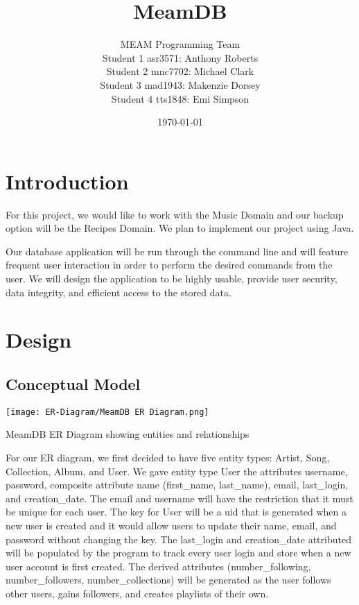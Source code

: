 \documentclass[12pt]{article}
\title{MeamDB}
\date{\today}
\author{MEAM Programming Team \\
Student 1 asr3571: Anthony Roberts\\
Student 2 mnc7702: Michael Clark\\
Student 3 mad1943: Makenzie Dorsey\\
Student 4 tts1848: Emi Simpson\\
}
\begin{document}
    \maketitle

    \section{Introduction}
    For this project, we would like to work with the Music Domain
    and our backup option will be the Recipes Domain. We plan to
    implement our project using Java.

    \vspace{0.5cm}

    \noindent Our database application will be run through the command line
    and will feature frequent user interaction in order to perform the desired
    commands from the user. We will design the application to be highly usable,
    provide user security, data integrity, and efficient access to the stored data.

    \section{Design}
    \subsection{Conceptual Model}

    \vspace{0.5cm}


    \begin{center}
    \texttt{[image: ER-Diagram/MeamDB ER Diagram.png]}
    \caption{MeamDB ER Diagram showing entities and relationships}
    \label{ER Diagram}
    \end{center}

    \vspace{0.5cm}

    \noindent For our ER diagram, we first decided to have five entity types:
    Artist, Song, Collection, Album, and User. We gave entity type User the attributes
    username, password, composite attribute name (first\_name, last\_name), email,
    last\_login, and creation\_date. The email and username will have the restriction that it must be unique
    for each user. The key for User will be a uid that is generated when a new user is
    created and it would allow users to update their name, email, and password without
    changing the key. The last\_login and creation\_date attributed will be populated by the program
    to track every user login and store when a new user account is first created. The derived attributes
    (number\_following, number\_followers, number\_collections) will be generated as the user
    follows other users, gains followers, and creates playlists of their own.
\end{document}
